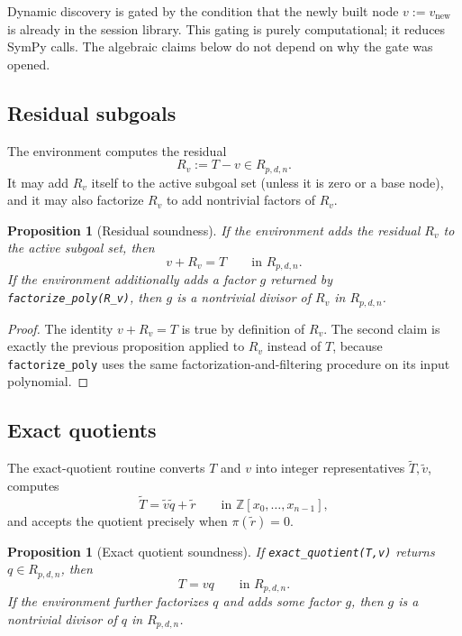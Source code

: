 \documentclass[11pt]{article}
\newtheorem{proposition}[theorem]{Proposition}
\theoremstyle{remark}
\newcommand{\Z}{\mathbb{Z}}
\begin{document}
Dynamic discovery is gated by the condition that the newly built node
$v := v_{\mathrm{new}}$ is already in the session library. This gating is purely
computational; it reduces SymPy calls. The algebraic claims below do not depend
on why the gate was opened.

\subsection{Residual subgoals}

The environment computes the residual
\[
R_v := T - v \in R_{p,d,n}.
\]
It may add $R_v$ itself to the active subgoal set (unless it is zero or a base
node), and it may also factorize $R_v$ to add nontrivial factors of $R_v$.

\begin{proposition}[Residual soundness]
If the environment adds the residual $R_v$ to the active subgoal set, then
\[
v + R_v = T
\qquad \text{in } R_{p,d,n}.
\]
If the environment additionally adds a factor $g$ returned by
\texttt{factorize\_poly(R\_v)}, then $g$ is a nontrivial divisor of $R_v$ in
$R_{p,d,n}$.
\end{proposition}

\begin{proof}
The identity $v + R_v = T$ is true by definition of $R_v$. The second claim is
exactly the previous proposition applied to $R_v$ instead of $T$, because
\texttt{factorize\_poly} uses the same factorization-and-filtering procedure on
its input polynomial.
\end{proof}

\subsection{Exact quotients}

The exact-quotient routine converts $T$ and $v$ into integer representatives
$\widetilde{T},\widetilde{v}$, computes
\[
\widetilde{T} = \widetilde{v}\widetilde{q} + \widetilde{r}
\qquad \text{in } \Z[x_0,\dots,x_{n-1}],
\]
and accepts the quotient precisely when $\pi(\widetilde{r}) = 0$.

\begin{proposition}[Exact quotient soundness]
If \texttt{exact\_quotient(T,v)} returns $q \in R_{p,d,n}$, then
\[
T = v q
\qquad \text{in } R_{p,d,n}.
\]
If the environment further factorizes $q$ and adds some factor $g$, then $g$ is
a nontrivial divisor of $q$ in $R_{p,d,n}$.
\end{proposition}
\end{document}
